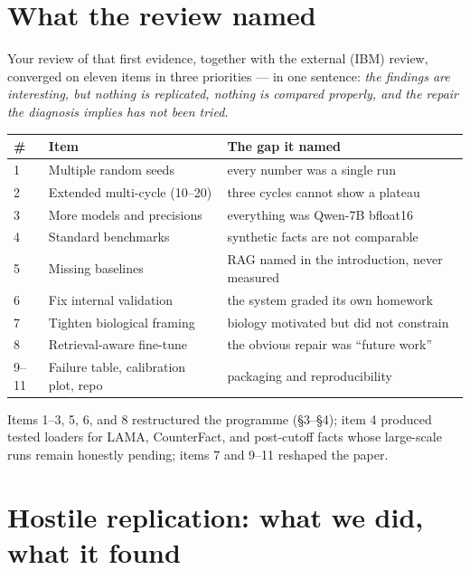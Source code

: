 \documentclass[11pt]{article}
\begin{document}
\section{What the review named}

Your review of that first evidence, together with the external (IBM) review, converged on eleven
items in three priorities --- in one sentence: \emph{the findings are interesting, but nothing is
replicated, nothing is compared properly, and the repair the diagnosis implies has not been
tried.}

\begin{center}
\small
\begin{tabular}{@{}l l l@{}}
\toprule
\# & Item & The gap it named \\
\midrule
1  & Multiple random seeds        & every number was a single run \\
2  & Extended multi-cycle (10--20) & three cycles cannot show a plateau \\
3  & More models and precisions   & everything was Qwen-7B bfloat16 \\
4  & Standard benchmarks          & synthetic facts are not comparable \\
5  & Missing baselines            & RAG named in the introduction, never measured \\
6  & Fix internal validation      & the system graded its own homework \\
7  & Tighten biological framing   & biology motivated but did not constrain \\
8  & Retrieval-aware fine-tune    & the obvious repair was ``future work'' \\
9--11 & Failure table, calibration plot, repo & packaging and reproducibility \\
\bottomrule
\end{tabular}
\end{center}

Items 1--3, 5, 6, and 8 restructured the programme (\S3--\S4); item 4 produced tested loaders for
LAMA, CounterFact, and post-cutoff facts whose large-scale runs remain honestly pending; items 7
and 9--11 reshaped the paper.

\section{Hostile replication: what we did, what it found}
\end{document}
